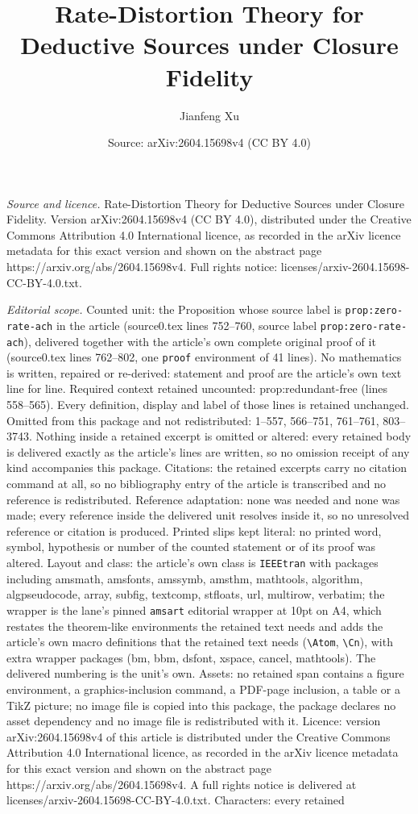 \documentclass[10pt,a4paper]{amsart}
\title[Rate-Distortion Theory for Deductive Sources under Closure F]{Rate-Distortion Theory for Deductive Sources under Closure Fidelity}
\author{Jianfeng Xu}
\date{Source: arXiv:2604.15698v4 (CC BY 4.0)}
\begin{document}
\maketitle

\noindent\emph{Source and licence.} Rate-Distortion Theory for Deductive Sources under Closure Fidelity. Version arXiv:2604.15698v4 (CC BY 4.0), distributed under the Creative Commons Attribution 4.0 International licence, as recorded in the arXiv licence metadata for this exact version and shown on the abstract page https://arxiv.org/abs/2604.15698v4. Full rights notice: licenses/arxiv-2604.15698-CC-BY-4.0.txt.\par\smallskip

\noindent\textit{Editorial scope.} Counted unit: the Proposition whose source label is \texttt{prop:zero-rate-ach} in the article (source0.tex lines 752--760, source label \texttt{prop:zero-rate-ach}), delivered together with the article's own complete original proof of it (source0.tex lines 762--802, one \texttt{proof} environment of 41 lines). No mathematics is written, repaired or re-derived: statement and proof are the article's own text line for line. Required context retained uncounted: prop:redundant-free (lines 558--565). Every definition, display and label of those lines is retained unchanged. Omitted from this package and not redistributed: 1--557, 566--751, 761--761, 803--3743. Nothing inside a retained excerpt is omitted or altered: every retained body is delivered exactly as the article's lines are written, so no omission receipt of any kind accompanies this package. Citations: the retained excerpts carry no citation command at all, so no bibliography entry of the article is transcribed and no reference is redistributed. Reference adaptation: none was needed and none was made; every reference inside the delivered unit resolves inside it, so no unresolved reference or citation is produced. Printed slips kept literal: no printed word, symbol, hypothesis or number of the counted statement or of its proof was altered. Layout and class: the article's own class is \texttt{IEEEtran} with packages including amsmath, amsfonts, amssymb, amsthm, mathtools, algorithm, algpseudocode, array, subfig, textcomp, stfloats, url, multirow, verbatim; the wrapper is the lane's pinned \texttt{amsart} editorial wrapper at 10pt on A4, which restates the theorem-like environments the retained text needs and adds the article's own macro definitions that the retained text needs (\texttt{\textbackslash Atom}, \texttt{\textbackslash Cn}), with extra wrapper packages (bm, bbm, dsfont, xspace, cancel, mathtools). The delivered numbering is the unit's own. Assets: no retained span contains a figure environment, a graphics-inclusion command, a PDF-page inclusion, a table or a TikZ picture; no image file is copied into this package, the package declares no asset dependency and no image file is redistributed with it. Licence: version arXiv:2604.15698v4 of this article is distributed under the Creative Commons Attribution 4.0 International licence, as recorded in the arXiv licence metadata for this exact version and shown on the abstract page https://arxiv.org/abs/2604.15698v4. A full rights notice is delivered at licenses/arxiv-2604.15698-CC-BY-4.0.txt. Characters: every retained 
\end{document}
